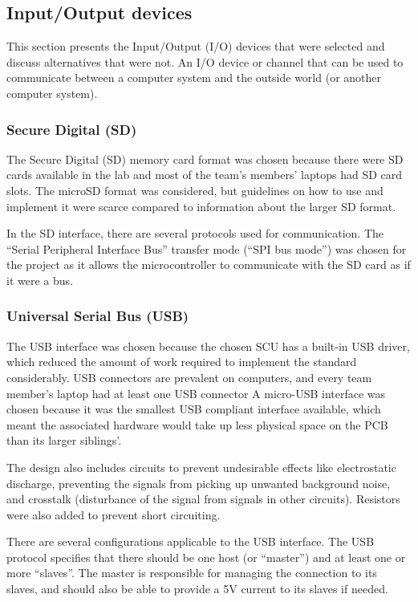 \subsection{Input/Output devices} \label{pcb:design-choices:ss:IO_devices}
This section presents the Input/Output (I/O) devices that were selected and discuss alternatives that were not.
An I/O device or channel that can be used to communicate between a computer system and the outside world (or another computer system).

\subsubsection{Secure Digital (SD)} 
The Secure Digital (SD) memory card format was chosen because there were SD cards available in the lab and most of the team's members' laptops had SD card slots.
The microSD format was considered, but guidelines on how to use and implement it were scarce compared to information about the larger SD format.

In the SD interface, there are several protocols used for communication. 
The ``Serial Peripheral Interface Bus'' transfer mode (``SPI bus mode'') was chosen for the project as it allows the microcontroller to communicate with the SD card as if it were a bus.


\subsubsection{Universal Serial Bus (USB)}
The USB interface was chosen because the chosen SCU has a built-in USB driver, which reduced the amount of work required to implement the standard considerably.
USB connectors are prevalent on computers, and every team member's laptop had at least one USB connector
A micro-USB interface was chosen because it was the smallest USB compliant interface available, which meant the associated hardware would take up less physical space on the PCB than its larger siblings'.

The design also includes circuits to prevent undesirable effects like electrostatic discharge, preventing the signals from picking up unwanted background noise, and crosstalk (disturbance of the signal from signals in other circuits).
Resistors were also added to prevent short circuiting.

There are several configurations applicable to the USB interface.
The USB protocol specifies that there should be one host (or ``master'') and at least one or more ``slaves''.
The master is responsible for managing the connection to its slaves, and should also be able to provide a 5V current to its slaves if needed.

